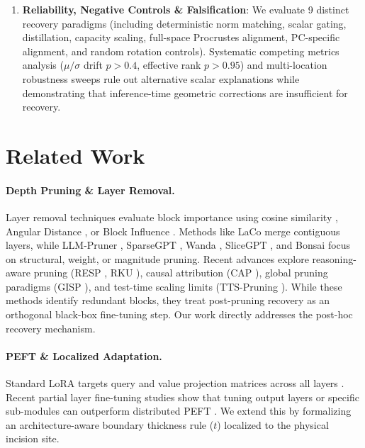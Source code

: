 \documentclass[11pt]{article}
\begin{document}
\begin{enumerate}
    \item \textbf{Reliability, Negative Controls \& Falsification}: We evaluate 9 distinct recovery paradigms (including deterministic norm matching, scalar gating, distillation, capacity scaling, full-space Procrustes alignment, PC-specific alignment, and random rotation controls). Systematic competing metrics analysis ($\mu/\sigma$ drift $p > 0.4$, effective rank $p > 0.95$) and multi-location robustness sweeps rule out alternative scalar explanations while demonstrating that inference-time geometric corrections are insufficient for recovery.
\end{enumerate}

\section{Related Work}

\paragraph{Depth Pruning \& Layer Removal.} 
Layer removal techniques evaluate block importance using cosine similarity \citep{gromov2024unreasonable}, Angular Distance \citep{siddiqui2024deeper}, or Block Influence \citep{men-etal-2025-shortgpt}. Methods like LaCo \citep{yang-etal-2024-laco} merge contiguous layers, while LLM-Pruner \citep{ma2023llmpruner}, SparseGPT \citep{frantar2023sparsegpt}, Wanda \citep{sun2024wanda}, SliceGPT \citep{ashkboos2024slicegpt}, and Bonsai \citep{kolawole2024bonsai} focus on structural, weight, or magnitude pruning. Recent advances explore reasoning-aware pruning (RESP \citep{wang2025resp}, RKU \citep{qian2026rku}), causal attribution (CAP \citep{sheth2026cap}), global pruning paradigms (GISP \citep{wang2026gisp}), and test-time scaling limits (TTS-Pruning \citep{monjur2026ttspruning}). While these methods identify redundant blocks, they treat post-pruning recovery as an orthogonal black-box fine-tuning step. Our work directly addresses the post-hoc recovery mechanism.

\paragraph{PEFT \& Localized Adaptation.} 
Standard LoRA targets query and value projection matrices across all layers \citep{hu2022lora}. Recent partial layer fine-tuning studies show that tuning output layers or specific sub-modules can outperform distributed PEFT \citep{yaolu2026reassessing}. We extend this by formalizing an architecture-aware boundary thickness rule ($t$) localized to the physical incision site.
\end{document}
